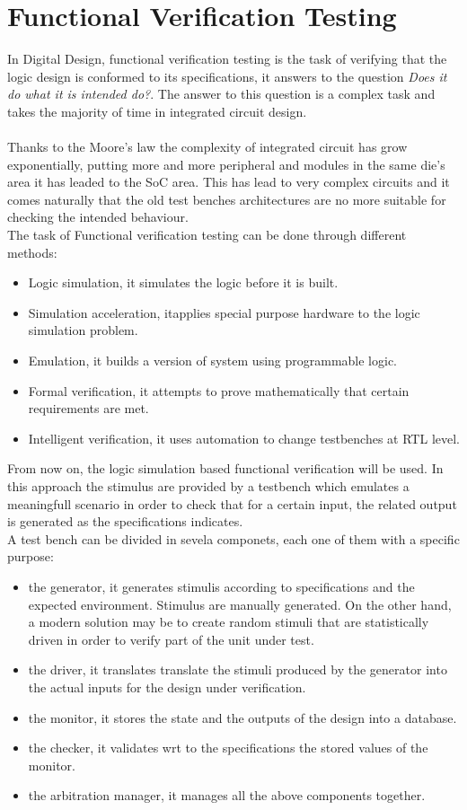 \chapter{Functional Verification Testing}
\label{fvt}
In Digital Design, functional verification testing is the task of verifying that the logic design is conformed to its specifications, it answers to the question \textit{Does it do what it is intended do?}. The answer to this question is a complex task and takes the majority of time in integrated circuit design.\\\\
Thanks to the Moore's law \cite{paper:1} the complexity of integrated circuit has grow exponentially, putting more and more peripheral and modules in the same die's area it has leaded to the SoC area. This has lead to very complex circuits and it comes naturally that the old test benches architectures are no more suitable for checking the intended behaviour.\\

The task of Functional verification testing can be done through different methods:
\begin{itemize}
\item Logic simulation, it simulates the logic before it is built.
\item Simulation acceleration, itapplies special purpose hardware to the logic simulation problem.
\item   Emulation, it builds a version of system using programmable logic. 
\item Formal verification, it attempts to prove mathematically that certain requirements are met.
\item  Intelligent verification, it uses automation to change testbenches at RTL level.
\end{itemize}

From now on, the logic simulation based functional verification will be used. In this approach the stimulus are provided by a testbench which emulates a meaningfull scenario in order to check that for a certain input, the related output is generated as the specifications indicates.\\
A test bench can be divided in sevela componets, each one of them with a specific purpose:
\begin{itemize}
\item the generator, it generates stimulis according to specifications and the expected environment.
Stimulus are manually generated. On the other hand, a modern solution may be to create random stimuli that are statistically driven in order to verify part of the unit under test. 
\item the driver, it translates translate the stimuli produced by the generator into the actual inputs for the design under verification.
\item the monitor, it stores the state and the outputs of the design into a database.
\item the checker, it validates wrt to the specifications the stored values of the monitor.
\item the arbitration manager, it manages all the above components together.
\end{itemize}

